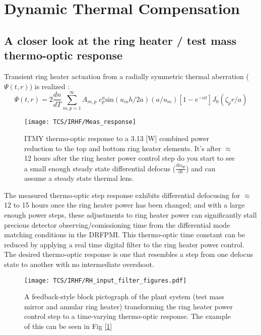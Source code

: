 \section{Dynamic Thermal Compensation}
\subsection{A closer look at the ring heater / test mass thermo-optic response}
Transient ring heater actuation from a radially symmetric thermal aberration ($\Psi(t,r)$) is realized \cite{Ramette:16}:
\begin{equation}
	\Psi(t,r)=2\frac{dn}{dT} \sum^{\infty}_{m,p = 1} A_{m,p} \; c^{u}_{p} \mathrm{sin}(u_m h /2a) (a/u_m)[1-e^{-\alpha t}] J_0(\zeta_p r/a)
\end{equation}

\begin{figure}[H]
 \texttt{[image: TCS/IRHF/Meas\_response]}
 \caption{ITMY thermo-optic response to a 3.13 [W] combined power reduction to the top and bottom ring heater elements. It's after $\approx$ 12 hours after the ring heater power control step do you start to see a small enough steady state differential defocus ($\frac{\mathrm{d} \alpha_\mathrm{sp}}{\mathrm{dt}}$) and can assume a steady state thermal lens.}
 \label{fig:meas}
\end{figure}

The measured thermo-optic step response exhibits differential defocusing for $\approx$ 12 to 15 hours once the ring heater power has been changed; and with a large enough power steps, these adjustments to ring heater power can significantly stall precious detector observing/comissioning time from the differential mode matching conditions in the DRFPMI. This thermo-optic time constant can be reduced by applying a real time digital filter to the ring heater power control. The desired thermo-optic response is one that resembles a step from one defocus state to another with no intermediate overshoot. 

\begin{figure}[H]
\centering
\texttt{[image: TCS/IRHF/RH\_input\_filter\_figures.pdf]}
\caption{A feedback-style block pictograph of the plant system (test mass mirror and annular ring heater) transforming the ring heater power control step to a time-varying thermo-optic response. The example of this can be seen in Fig [\ref{fig:meas}]}
\label{fig:justplant}
\end{figure}

